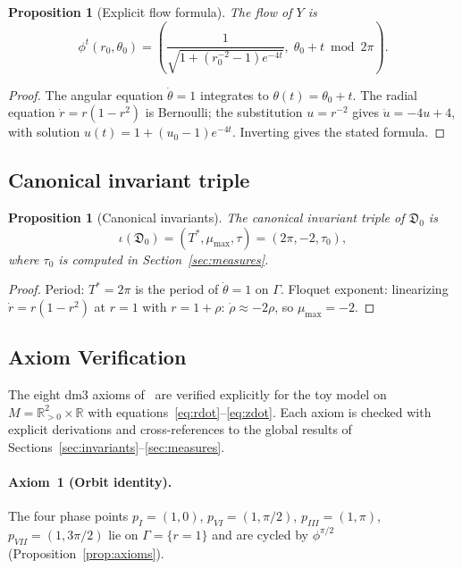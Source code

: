 \documentclass[12pt, oneside]{book}
\theoremstyle{plain}
\newtheorem{proposition}[theorem]{Proposition}
\theoremstyle{definition}
\theoremstyle{remark}
\newcommand{\dm}{\mathfrak{D}}
\newcommand{\Orb}{\Gamma}
\begin{document}
\begin{proposition}[Explicit flow formula]\label{prop:flow}
The flow of $Y$ is
\[
  \phi^t(r_0,\theta_0) =
  \left(\frac{1}{\sqrt{1+(r_0^{-2}-1)e^{-4t}}},\;
  \theta_0 + t\bmod 2\pi\right).
\]
\end{proposition}
\begin{proof}
The angular equation $\dot\theta=1$ integrates to $\theta(t)=\theta_0+t$.
The radial equation $\dot r=r(1-r^2)$ is Bernoulli; the substitution
$u=r^{-2}$ gives $\dot u=-4u+4$, with solution
$u(t)=1+(u_0-1)e^{-4t}$. Inverting gives the stated formula.
\end{proof}

\subsection{Canonical invariant triple}

\begin{proposition}[Canonical invariants]\label{prop:canonical}
The canonical invariant triple of $\dm_0$ is
\[
  \iota(\dm_0) = (T^*,\mu_{\max},\tau) = (2\pi,-2,\tau_0),
\]
where $\tau_0$ is computed in Section~\ref{sec:measures}.
\end{proposition}
\begin{proof}
Period: $T^*=2\pi$ is the period of $\dot\theta=1$ on $\Orb$.
Floquet exponent: linearizing $\dot r=r(1-r^2)$ at $r=1$ with
$r=1+\rho$: $\dot\rho\approx-2\rho$, so $\mu_{\max}=-2$.
\end{proof}

\subsection{Axiom Verification}\label{subsec:axioms}

The eight dm3 axioms of~\cite{Paper1} are verified explicitly for
the toy model on $M=\mathbb{R}^2_{>0}\times\mathbb{R}$ with
equations~\eqref{eq:rdot}--\eqref{eq:zdot}. Each axiom is checked
with explicit derivations and cross-references to the global results
of Sections~\ref{sec:invariants}--\ref{sec:measures}.

\paragraph{Axiom~1 (Orbit identity).}
The four phase points $p_I=(1,0)$, $p_{VI}=(1,\pi/2)$,
$p_{III}=(1,\pi)$, $p_{VII}=(1,3\pi/2)$ lie on $\Orb=\{r=1\}$
and are cycled by $\phi^{\pi/2}$ (Proposition~\ref{prop:axioms}).
\end{document}
